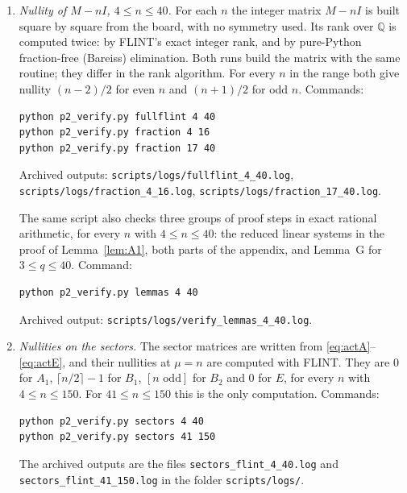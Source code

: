 \documentclass[11pt]{amsart}
\theoremstyle{plain}
\theoremstyle{definition}
\theoremstyle{remark}
\numberwithin{equation}{section}
\newcommand{\iv}[1]{[#1]}              %
\begin{document}
\begin{enumerate}
\item \emph{Nullity of \(M-nI\), \(4\le n\le40\).} For each \(n\) the integer matrix
\(M-nI\) is built square by square from the board, with no symmetry used. Its rank over
\(\mathbb{Q}\) is computed twice: by FLINT's exact integer rank, and by pure-Python
fraction-free (Bareiss) elimination. Both runs build the matrix with the same routine;
they differ in the rank algorithm. For every \(n\) in the range both give nullity
\((n-2)/2\) for even \(n\) and \((n+1)/2\) for odd \(n\). Commands:
\begin{verbatim}
python p2_verify.py fullflint 4 40
python p2_verify.py fraction 4 16
python p2_verify.py fraction 17 40
\end{verbatim}
Archived outputs: \nolinkurl{scripts/logs/fullflint_4_40.log},
\nolinkurl{scripts/logs/fraction_4_16.log}, \nolinkurl{scripts/logs/fraction_17_40.log}.

The same script also checks three groups of proof steps in exact rational arithmetic,
for every \(n\) with \(4\le n\le40\): the reduced linear systems in the proof of
Lemma~\ref{lem:A1}, both parts of the appendix, and Lemma~G for \(3\le q\le40\).
Command:
\begin{verbatim}
python p2_verify.py lemmas 4 40
\end{verbatim}
Archived output: \nolinkurl{scripts/logs/verify_lemmas_4_40.log}.

\item \emph{Nullities on the sectors.} The sector matrices are written from
\eqref{eq:actA}--\eqref{eq:actE}, and their nullities at \(\mu=n\) are computed with
FLINT. They are \(0\) for \(A_1\), \(\lceil n/2\rceil-1\) for \(B_1\),
\(\iv{n\text{ odd}}\) for \(B_2\) and \(0\) for \(E\), for every \(n\) with
\(4\le n\le150\). For \(41\le n\le150\) this is the only computation. Commands:
\begin{verbatim}
python p2_verify.py sectors 4 40
python p2_verify.py sectors 41 150
\end{verbatim}
The archived outputs are the files \nolinkurl{sectors_flint_4_40.log} and
\nolinkurl{sectors_flint_41_150.log} in the folder \nolinkurl{scripts/logs/}.


\end{enumerate}
\end{document}
